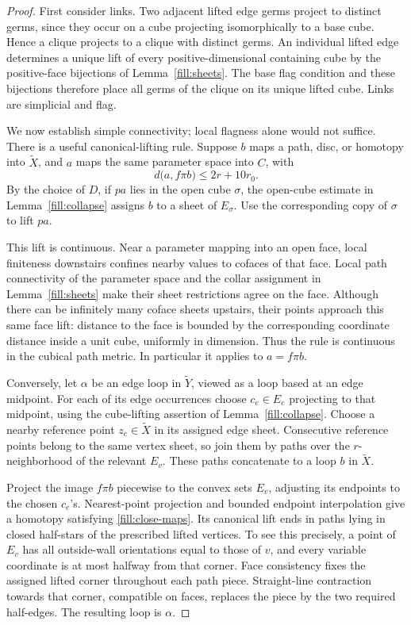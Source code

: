 \begin{proof}
First consider links.  Two adjacent lifted edge germs project to
distinct germs, since they occur on a cube projecting isomorphically
to a base cube.  Hence a clique projects to a clique with distinct germs.
An individual lifted edge determines a unique lift of every
positive-dimensional containing cube by the positive-face bijections
of Lemma~\ref{fill:sheets}.  The base flag condition and these bijections
therefore place all germs of the clique on its unique lifted cube.
Links are simplicial and flag.

We now establish simple connectivity; local flagness alone would not
suffice.  There is a useful canonical-lifting rule.  Suppose \(b\) maps
a path, disc, or homotopy into \(\widetilde X\), and \(a\) maps the same
parameter space into \(C\), with
\begin{equation}
 d\bigl(a,f\pi b\bigr)\le 2r+10r_0.
 \label{fill:close-maps}
\end{equation}
By the choice of \(D\), if \(p a\) lies in the open
cube \(\sigma\), the open-cube estimate in Lemma~\ref{fill:collapse}
assigns \(b\) to a sheet of \(E_\sigma\).  Use the corresponding copy of
\(\sigma\) to lift \(p a\).

This lift is continuous.  Near a parameter mapping into an open face,
local finiteness downstairs confines nearby values to cofaces of that
face.  Local path connectivity of the parameter space and the collar
assignment in Lemma~\ref{fill:sheets} make their sheet restrictions
agree on the face.  Although there can be infinitely many coface sheets
upstairs, their points approach this same face lift: distance to the
face is bounded by the corresponding coordinate distance inside a
unit cube, uniformly in dimension.  Thus the rule is continuous in
the cubical path metric.  In particular it applies to \(a=f\pi b\).

Conversely, let \(\alpha\) be an edge loop in \(\widetilde Y\), viewed
as a loop based at an edge midpoint.  For each of its edge occurrences
choose \(c_e\in E_e\) projecting to that midpoint, using the cube-lifting
assertion of Lemma~\ref{fill:collapse}.  Choose a nearby reference point
\(z_e\in\widetilde X\) in its assigned edge sheet.  Consecutive reference
points belong to the same vertex sheet, so join them by paths over the
\(r\)-neighborhood of the relevant \(E_v\).  These paths concatenate
to a loop \(b\) in \(\widetilde X\).

Project the image \(f\pi b\) piecewise to the convex sets \(E_v\),
adjusting its endpoints to the chosen \(c_e\)'s.  Nearest-point projection
and bounded endpoint interpolation give a homotopy satisfying
\eqref{fill:close-maps}.  Its canonical lift ends in paths lying in
closed half-stars of the prescribed lifted vertices.  To see this
precisely, a point of \(E_v\) has all outside-wall orientations equal
to those of \(v\), and every variable coordinate is at most halfway
from that corner.  Face consistency fixes the assigned lifted corner
throughout each path piece.  Straight-line contraction towards that
corner, compatible on faces, replaces the piece by the two required
half-edges.  The resulting loop is \(\alpha\).


\end{proof}
